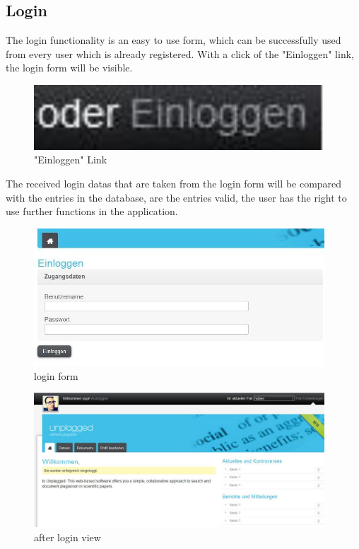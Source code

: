 \subsection{Login}

The login functionality is an easy to use form, which can be successfully used from every user which is already 
registered. With a click of the "Einloggen" link, the login form will be visible.

\begin{figure}[!ht]
  \centering
    \includegraphics[width=0.97\textwidth]{images/basic_functionalities/oderEinloggen.jpg}
  \caption{"Einloggen" Link}
  \label{fig:einloggen}
\end{figure}

The received login datas that are taken from the login form will be compared with the entries in the database, are the 
entries valid, the user has the right to use further functions in the application.

\begin{figure}[!ht]
  \centering
    \includegraphics[width=0.97\textwidth]{images/basic_functionalities/login_form.jpg}
  \caption{login form}
  \label{fig:einloggen}
\end{figure}

\begin{figure}[!ht]
  \centering
    \includegraphics[width=0.97\textwidth]{images/basic_functionalities/after_login.jpg}
  \caption{after login view}
  \label{fig:einloggen}
\end{figure}

